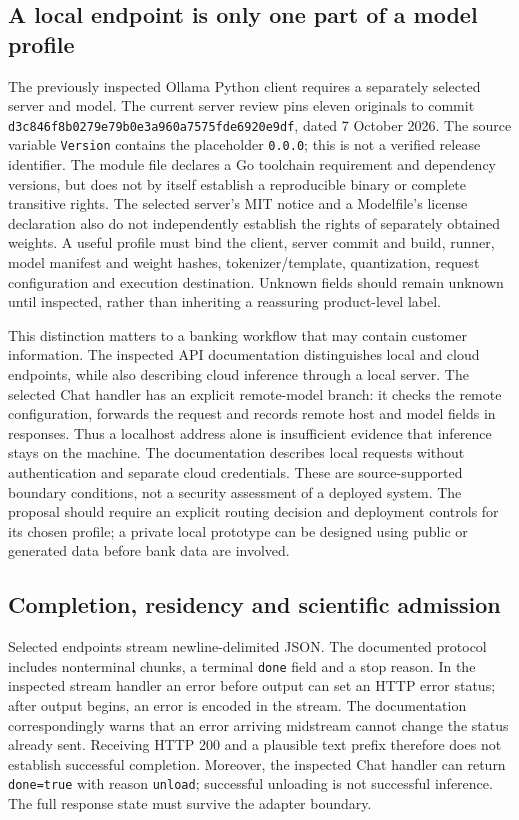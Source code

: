 \subsection{A local endpoint is only one part of a model profile}
The previously inspected Ollama Python client requires a separately selected server and model.
The current server review pins eleven originals to commit
\texttt{d3c846f8b0279e79b0e3\allowbreak{}a960a7575fde6920e9df}, dated 7 October 2026.
The source variable \texttt{Version} contains the placeholder \texttt{0.0.0}; this is not a
verified release identifier. The module file declares a Go toolchain requirement and dependency
versions, but does not by itself establish a reproducible binary or complete transitive rights.
The selected server's MIT notice and a Modelfile's license declaration also do not independently
establish the rights of separately obtained weights. A useful profile must bind the client,
server commit and build, runner, model manifest and weight hashes, tokenizer/template,
quantization, request configuration and execution destination. Unknown fields should remain
unknown until inspected, rather than inheriting a reassuring product-level label.
\citep{exec28_bp_ollama}

This distinction matters to a banking workflow that may contain customer information.
The inspected API documentation distinguishes local and cloud endpoints, while also describing
cloud inference through a local server. The selected Chat handler has an explicit remote-model
branch: it checks the remote configuration, forwards the request and records remote host and
model fields in responses. Thus a localhost address alone is insufficient evidence that inference
stays on the machine. The documentation describes local requests without authentication and
separate cloud credentials. These are source-supported boundary conditions, not a security
assessment of a deployed system. The proposal should require an explicit routing decision and
deployment controls for its chosen profile; a private local prototype can be designed using
public or generated data before bank data are involved.\citep{exec28_bp_ollama}

\subsection{Completion, residency and scientific admission}
Selected endpoints stream newline-delimited JSON. The documented protocol includes nonterminal
chunks, a terminal \texttt{done} field and a stop reason. In the inspected stream handler an error
before output can set an HTTP error status; after output begins, an error is encoded in the
stream. The documentation correspondingly warns that an error arriving midstream cannot change
the status already sent. Receiving HTTP 200 and a plausible text prefix therefore does not
establish successful completion. Moreover, the inspected Chat handler can return
\texttt{done=true} with reason \texttt{unload}; successful unloading is not successful inference.
The full response state must survive the adapter boundary.\citep{exec28_bp_ollama}

